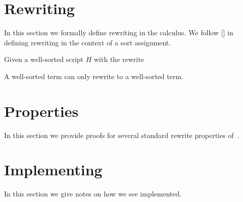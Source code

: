 \documentclass[letterpaper,11pt]{article}
\begin{document}


\section{Rewriting}
\label{sec:rewriting}

In this section we formally define rewriting in the \hax calculus. We follow [] in
defining rewriting in the context of a sort assignment.

\begin{definition}[substitution]
  
\end{definition}


\begin{theorem}
  Given a well-sorted \hax script $H$ with the rewrite 


A well-sorted term can only rewrite to a well-sorted term.
\end{theorem}


\section{Properties}
\label{sec:properties}

In this section we provide proofs for several standard rewrite properties of~\hax.




\section{Implementing \hax}
\label{sec:implement}

In this section we give notes on how we see \hax implemented.



\end{document}
